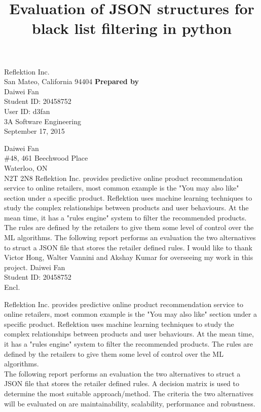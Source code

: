 \documentclass[12pt]{article}
\begin{document}
\title{Evaluation of JSON structures for black list filtering in python}
{
	Reflektion Inc.\\
	San Mateo, California 94404
}
{
	\textbf{Prepared by}\\[2ex]
	
	Daiwei Fan\\
	Student ID: 20458752\\
	User ID: d3fan\\
	3A Software Engineering\\
	September 17, 2015
}


{
	\noindent
	Daiwei Fan\\
	\#48, 461 Beechwood Place\\
	Waterloo, ON\\
	N2T 2N8
}
{
	Reflektion Inc. provides predictive online product recommendation service to online retailers, most common example is the "You may also like" section under a specific product. Reflektion uses machine learning techniques to study the complex relationships between products and user behaviours. At the mean time, it has a "rules engine" system to filter the recommended products. The rules are defined by the retailers to give them some level of control over the ML algorithms. The following report performs an evaluation the two alternatives to struct a JSON file that stores the retailer defined rules.
}
{
	I would like to thank Victor Hong, Walter Vannini and Akshay Kumar for overseeing my work in this project.
}
{
	Daiwei Fan\\
	Student ID: 20458752\\[2ex]
	Encl.
}


Reflektion Inc. provides predictive online product recommendation service to online retailers, most common example is the "You may also like" section under a specific product. Reflektion uses machine learning techniques to study the complex relationships between products and user behaviours. At the mean time, it has a "rules engine" system to filter the recommended products. The rules are defined by the retailers to give them some level of control over the ML algorithms.\\

 The following report performs an evaluation the two alternatives to struct a JSON file that stores the retailer defined rules. A decision matrix is used to determine the most suitable approach/method. The criteria the two alternatives will be evaluated on are maintainability, scalability, performance and robustness.  \\
\end{document}
